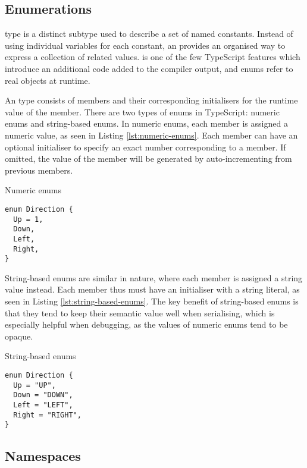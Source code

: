 \subsection{Enumerations}

 type is a distinct subtype used to describe a set of named constants. Instead of using individual variables for each constant, an  provides an organised way to express a collection of related values.  is one of the few TypeScript features which introduce an additional code added to the compiler output, and enums refer to real objects at runtime.

An  type consists of members and their corresponding initialisers for the runtime value of the member. There are two types of enums in TypeScript: numeric enums and string-based enums. In numeric enums, each member is assigned a numeric value, as seen in Listing \ref{lst:numeric-enums}. Each member can have an optional initialiser to specify an exact number corresponding to a member. If omitted, the value of the member will be generated by auto-incrementing from previous members.

\begin{listing}[ht]
  \caption{Numeric enums}\label{lst:numeric-enums}
  \begin{verbatim}
enum Direction {
  Up = 1,
  Down,
  Left,
  Right,
}
\end{verbatim}
\end{listing}

String-based enums are similar in nature, where each member is assigned a string value instead. Each member thus must have an initialiser with a string literal, as seen in Listing \ref{lst:string-based-enums}. The key benefit of string-based enums is that they tend to keep their semantic value well when serialising, which is especially helpful when debugging, as the values of numeric enums tend to be opaque.

\begin{listing}[ht]
  \caption{String-based enums}\label{lst:string-based-enums}
  \begin{verbatim}
enum Direction {
  Up = "UP",
  Down = "DOWN",
  Left = "LEFT",
  Right = "RIGHT",
}
\end{verbatim}
\end{listing}

\subsection{Namespaces}

